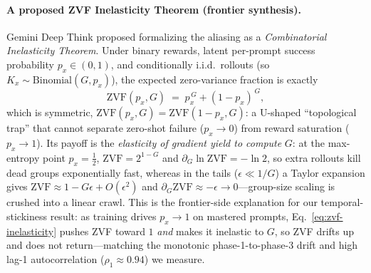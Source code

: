 \paragraph{A proposed ZVF Inelasticity Theorem (frontier synthesis).}
Gemini Deep Think proposed formalizing the aliasing as a
\emph{Combinatorial Inelasticity Theorem}. Under binary rewards, latent
per-prompt success probability $p_x\in(0,1)$, and conditionally i.i.d.\
rollouts (so $K_x\sim\mathrm{Binomial}(G,p_x)$), the expected
zero-variance fraction is exactly
\begin{equation}
  \mathrm{ZVF}(p_x,G) \;=\; p_x^{\,G} + (1-p_x)^{\,G},
  \label{eq:zvf-inelasticity}
\end{equation}
which is symmetric, $\mathrm{ZVF}(p_x,G)=\mathrm{ZVF}(1-p_x,G)$: a
U-shaped ``topological trap'' that cannot separate zero-shot failure
($p_x\to0$) from reward saturation ($p_x\to1$). Its payoff is the
\emph{elasticity of gradient yield to compute} $G$: at the max-entropy
point $p_x=\tfrac12$, $\mathrm{ZVF}=2^{1-G}$ and
$\partial_G\ln\mathrm{ZVF}=-\ln 2$, so extra rollouts kill dead groups
exponentially fast, whereas in the tails ($\epsilon\ll 1/G$) a Taylor
expansion gives $\mathrm{ZVF}\approx 1-G\epsilon+O(\epsilon^2)$ and
$\partial_G\mathrm{ZVF}\approx-\epsilon\to 0$---group-size scaling is
crushed into a linear crawl. This is the frontier-side explanation for
our temporal-stickiness result: as training drives $p_x\to1$ on mastered
prompts, Eq.~\eqref{eq:zvf-inelasticity} pushes ZVF toward $1$
\emph{and} makes it inelastic to $G$, so ZVF drifts up and does not
return---matching the monotonic phase-1-to-phase-3 drift and high lag-1
autocorrelation ($\rho_1\approx0.94$) we measure.

